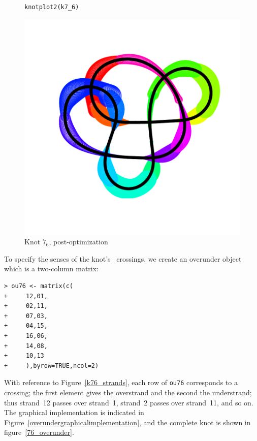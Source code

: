 \documentclass{birkjour}
\theoremstyle{definition}
\theoremstyle{remark}
\numberwithin{equation}{section}
\begin{document}
\begin{figure}[!tbp]
\begin{verbatim}
knotplot2(k7_6)
\end{verbatim}
  \centering
\includegraphics[scale = 0.9]{knot-k76_knotplot2} %
\caption{Knot $7_6$, post-optimization\label{7_6}}
\end{figure}
   
To specify the senses of the knot's\ %
crossings, we create an overunder object which is a two-column matrix:

\begin{verbatim}
> ou76 <- matrix(c(
+     12,01,
+     02,11,
+     07,03,
+     04,15,
+     16,06,
+     14,08,
+     10,13
+     ),byrow=TRUE,ncol=2)
\end{verbatim}

With reference to Figure~\ref{k76_strands}, each row of {\tt ou76}
corresponds to a crossing; the first element gives the overstrand and
the second the understrand; thus strand~12 passes over strand~1,
strand~2 passes over strand~11, and so on.  The graphical
implementation is indicated in
Figure~\ref{overundergraphicalimplementation}, and the complete knot
is shown in figure~\ref{76_overunder}.
\end{document}

